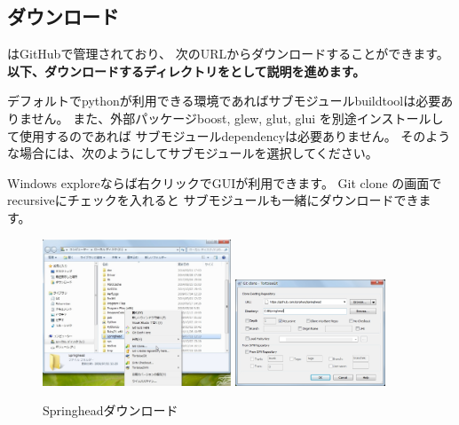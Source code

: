\subsection{ダウンロード}
\label{subsec:Download}
\parindent=0pt

\SprLib はGitHubで管理されており、
次のURLからダウンロードすることができます。
\bf{以下、ダウンロードするディレクトリを\SprTop{}として説明を進めます。}

\medskip

デフォルトでpythonが利用できる環境であればサブモジュールbuildtoolは必要ありません。
また、外部パッケージboost, glew, glut, glui を別途インストールして使用するのであれば
サブモジュールdependencyは必要ありません。
そのような場合には、次のようにしてサブモジュールを選択してください。


\medskip
Windows exploreならば右クリックでGUIが利用できます。
Git clone の画面で recursiveにチェックを入れると
サブモジュールも一緒にダウンロードできます。

\begin{narrow}[15pt]
	\begin{figure}[h]
	\begin{center}
	\includegraphics[width=0.5\textwidth]{fig/SpringheadClone1.eps}
	\includegraphics[width=0.4\textwidth]{fig/SpringheadClone2.eps}
	\end{center}
	\caption{Springheadダウンロード}
	\label{fig:SpringheadClone}
	\end{figure}
\end{narrow}


\bigskip
